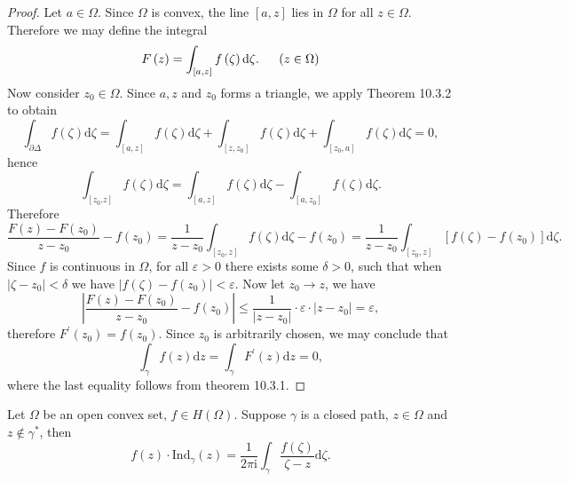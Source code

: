 \begin{proof}
Let $a\in\Omega$. Since $\Omega$ is convex, the line $[a,z]$ lies in $\Omega$ for all $z\in\Omega$. Therefore we may define the integral 
$$
F\left( z \right) =\int_{\left[ a,z \right]}{f\left( \zeta \right) \mathrm{d}\zeta}.\hspace{0.5cm}\left( z\in \Omega \right) 
$$
Now consider $z_0\in\Omega$. Since $a,z$ and $z_0$ forms a triangle, we apply Theorem 10.3.2 to obtain 
$$
\int_{\partial \Delta}{f\left( \zeta \right) \mathrm{d}\zeta}=\int_{\left[ a,z \right]}{f\left( \zeta \right) \mathrm{d}\zeta}+\int_{\left[ z,z_0 \right]}{f\left( \zeta \right) \mathrm{d}\zeta}+\int_{\left[ z_0,a \right]}{f\left( \zeta \right) \mathrm{d}\zeta}=0,
$$
hence 
$$
\int_{\left[ z_0.z \right]}{f\left( \zeta \right) \mathrm{d}\zeta}=\int_{\left[ a,z \right]}{f\left( \zeta \right) \mathrm{d}\zeta}-\int_{\left[ a,z_0 \right]}{f\left( \zeta \right) \mathrm{d}\zeta}.
$$
Therefore 
$$
\frac{F\left( z \right) -F\left( z_0 \right)}{z-z_0}-f\left( z_0 \right) =\frac{1}{z-z_0}\int_{\left[ z_0,z \right]}{f\left( \zeta \right) \mathrm{d}\zeta}-f\left( z_0 \right) =\frac{1}{z-z_0}\int_{\left[ z_0,z \right]}{\left[ f\left( \zeta \right) -f\left( z_0 \right) \right] \mathrm{d}\zeta}.
$$
Since $f$ is continuous in $\Omega$, for all $\varepsilon>0$ there exists some $\delta>0$, such that when $|\zeta-z_0|<\delta$ we have $|f(\zeta)-f(z_0)|<\varepsilon$. Now let $z_0\to z$, we have 
$$
\left| \frac{F\left( z \right) -F\left( z_0 \right)}{z-z_0}-f\left( z_0 \right) \right|\le \frac{1}{\left| z-z_0 \right|}\cdot \varepsilon \cdot \left| z-z_0 \right|=\varepsilon ,
$$
therefore $F^\prime(z_0)=f(z_0)$. Since $z_0$ is arbitrarily chosen, we may conclude that 
$$
\int_{\gamma}{f\left( z \right) \mathrm{d}z}=\int_{\gamma}{F^{\prime}\left( z \right) \mathrm{d}z}=0,
$$
where the last equality follows from theorem 10.3.1.
\end{proof}
\begin{theorem}
Let $\Omega$ be an open convex set, $f\in H(\Omega)$. Suppose $\gamma$ is a closed path, $z\in\Omega$ and $z\notin\gamma^*$, then 
$$
f\left( z \right) \cdot \mathrm{Ind}_{\gamma}\left( z \right) =\frac{1}{2\pi \mathrm{i}}\int_{\gamma}{\frac{f\left( \zeta \right)}{\zeta -z}\mathrm{d}\zeta}.
$$
\end{theorem}
